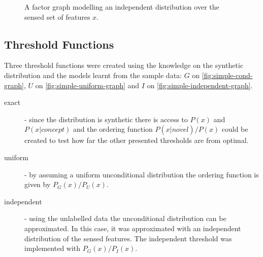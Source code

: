 \begin{figure}[h]
\centering
{}
\caption{\label{fig:simple-independent-graph}A factor graph modelling an
         independent distribution over the sensed set of features $x$.}
\end{figure}



\subsection{Threshold Functions}
Three threshold functions were created using the knowledge on the synthetic
distribution and the models learnt from the sample data:
$G$ on \autoref{fig:simple-cond-graph},
$U$ on \autoref{fig:simple-uniform-graph} and
$I$ on \autoref{fig:simple-independent-graph}.

\begin{description}
\item[exact] 
- since the distribution is synthetic there is access to $P(x)$ and $P(x|concept)$
and the ordering function $P(x|\overline{novel})/P(x)$ could be created
to test how far the other presented thresholds are from optimal.


\item[uniform]
- by assuming a uniform unconditional distribution the ordering function is
  given by $P_G(x)/P_U(x)$.

\item[independent]
- using the unlabelled data the unconditional distribution can be approximated.
  In this case, it was approximated with an independent distribution of the
  sensed features. The independent threshold was implemented with $P_G(x)/P_I(x)$.
\end{description}


